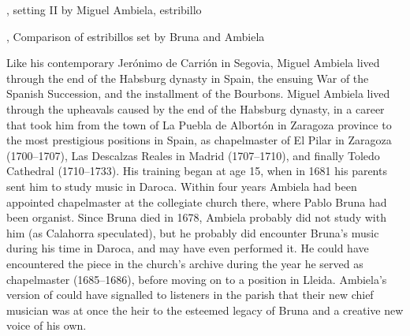 {, setting II by Miguel Ambiela, estribillo}

{, Comparison of estribillos set by Bruna and Ambiela}

Like his contemporary Jerónimo de Carrión in Segovia, Miguel Ambiela lived
through the end of the Habsburg dynasty in Spain, the ensuing War of the
Spanish Succession, and the installment of the Bourbons.
Miguel Ambiela lived through the upheavals caused by the end of the Habsburg
dynasty, in a career that took him from the town of La Puebla de Albortón in
Zaragoza province to the most prestigious positions in Spain, as chapelmaster
of El Pilar in Zaragoza (1700--1707), Las Descalzas Reales in Madrid
(1707--1710), and finally Toledo Cathedral (1710--1733).%
    \Autocites
    [1]{Calahorra:Suban}
    []{Grove}
    {Alvarez:Ambiela}
His training began at age 15, when in 1681 his parents sent him to study music
in Daroca.
Within four years Ambiela had been appointed chapelmaster at the collegiate
church there, where Pablo Bruna had been organist.
Since Bruna died in 1678, Ambiela probably did not study with him (as Calahorra
speculated), but he probably did encounter Bruna's music during his time in
Daroca, and may have even performed it.%
    \Autocite{Calahorra:Suban}
He could have encountered the piece in the church's archive during the year he
served as chapelmaster (1685--1686), before moving on to a position in Lleida.
Ambiela's version of  could have signalled to listeners
in the parish that their new chief musician was at once the heir to the
esteemed legacy of Bruna and a creative new voice of his own.

